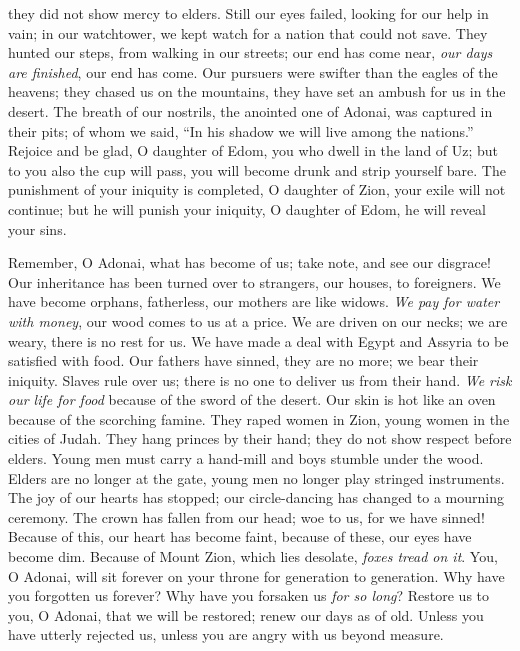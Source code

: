 \begin{biblechapter}
they did not show mercy to elders.
\verse Still our eyes failed, 
looking for our help in vain; 
in our watchtower, we kept watch 
for a nation that could not save.
\verse They hunted our steps, 
from walking in our streets; 
our end has come near, \textit{our days are finished}, 
our end has come.
\verse Our pursuers were swifter 
than the eagles of the heavens; 
they chased us on the mountains, 
they have set an ambush for us in the desert.
\verse The breath of our nostrils, the anointed one of Adonai, 
was captured in their pits; 
of whom we said, “In his shadow 
we will live among the nations.”
\verse Rejoice and be glad, O daughter of Edom, 
you who dwell in the land of Uz; 
but to you also the cup will pass, 
you will become drunk and strip yourself bare.
\verse The punishment of your iniquity is completed, O daughter of Zion, 
your exile will not continue; 
but he will punish your iniquity, O daughter of Edom, 
he will reveal your sins.
\end{biblechapter}

\begin{biblechapter} %
 Remember, O Adonai, what has become of us; 
take note, and see our disgrace!
\verse Our inheritance has been turned over to strangers, 
our houses, to foreigners.
\verse We have become orphans, fatherless, 
our mothers are like widows.
\verse \textit{We pay for water with money}, 
our wood comes to us at a price.
\verse We are driven on our necks; 
we are weary, there is no rest for us.
\verse We have made a deal with Egypt and Assyria 
to be satisfied with food.
\verse Our fathers have sinned, they are no more; 
we bear their iniquity.
\verse Slaves rule over us; 
there is no one to deliver us from their hand.
\verse \textit{We risk our life for food} 
because of the sword of the desert.
\verse Our skin is hot like an oven 
because of the scorching famine.
\verse They raped women in Zion, 
young women in the cities of Judah.
\verse They hang princes by their hand; 
they do not show respect before elders.
\verse Young men must carry a hand-mill 
and boys stumble under the wood.
\verse Elders are no longer at the gate, 
young men no longer play stringed instruments.
\verse The joy of our hearts has stopped; 
our circle-dancing has changed to a mourning ceremony.
\verse The crown has fallen from our head; 
woe to us, for we have sinned!
\verse Because of this, our heart has become faint, 
because of these, our eyes have become dim.
\verse Because of Mount Zion, which lies desolate, 
\textit{foxes tread on it}.
\verse You, O Adonai, will sit forever 
on your throne for generation to generation.
\verse Why have you forgotten us forever? 
Why have you forsaken us \textit{for so long}?
\verse Restore us to you, O Adonai, that we will be restored; 
renew our days as of old.
\verse Unless you have utterly rejected us, 
unless you are angry with us beyond measure.
\end{biblechapter}

